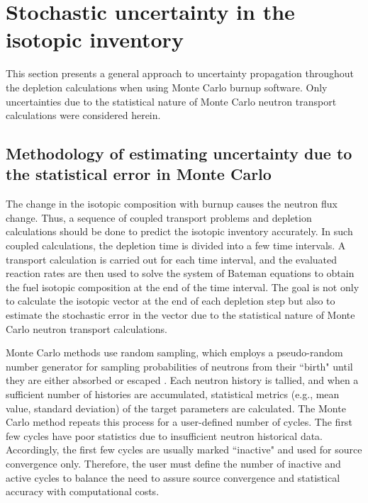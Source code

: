 \section{Stochastic uncertainty in the isotopic inventory} 
\label{sec:uq-stochastic}
This section presents a general approach to uncertainty propagation throughout 
the depletion calculations when using Monte Carlo burnup software. Only 
uncertainties due to the statistical nature of Monte Carlo neutron transport 
calculations were considered herein. 

\subsection{Methodology of estimating uncertainty due to the statistical error 
	in Monte Carlo}
The change in the isotopic composition with burnup causes the neutron flux 
change. Thus, a sequence of coupled transport problems and depletion 
calculations should be done to predict the isotopic inventory accurately. In 
such coupled calculations, the depletion time is divided into a few time 
intervals. A transport calculation is carried out for each time interval, and 
the evaluated reaction rates are then used to solve the system of Bateman 
equations to obtain the fuel isotopic composition at the end 
of the time interval. The goal is not only to calculate the isotopic vector at 
the end of each depletion step but also to estimate the stochastic error in 
the vector due to the statistical nature of Monte Carlo neutron transport 
calculations.

Monte Carlo methods use random sampling, which employs a pseudo-random 
number generator for sampling probabilities of neutrons from their ``birth" 
until they are either absorbed or escaped \cite{brown_fundamentals_2005}. Each 
neutron history is tallied, and when a sufficient number of histories are 
accumulated, statistical metrics (e.g., mean value, standard deviation) of the 
target parameters are calculated. The Monte Carlo method repeats this process 
for a user-defined number of cycles. The first few cycles have poor statistics 
due to insufficient neutron historical data. 
Accordingly, the first few cycles are usually marked ``inactive" and used for 
source convergence only. Therefore, the user must define the number of 
inactive and active cycles to balance the need to assure source convergence 
and statistical accuracy with computational costs.

